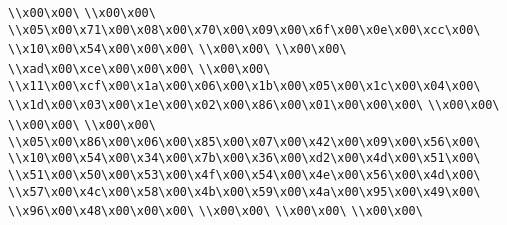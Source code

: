 \verb|\\x00\x00\|\newline
\verb|\\x00\x00\|\newline
\verb|\\x05\x00\x71\x00\x08\x00\x70\x00\x09\x00\x6f\x00\x0e\x00\xcc\x00\|\newline
\verb|\\x10\x00\x54\x00\x00\x00\|\newline
\verb|\\x00\x00\|\newline
\verb|\\x00\x00\|\newline
\verb|\\xad\x00\xce\x00\x00\x00\|\newline
\verb|\\x00\x00\|\newline
\verb|\\x11\x00\xcf\x00\x1a\x00\x06\x00\x1b\x00\x05\x00\x1c\x00\x04\x00\|\newline
\verb|\\x1d\x00\x03\x00\x1e\x00\x02\x00\x86\x00\x01\x00\x00\x00\|\newline
\verb|\\x00\x00\|\newline
\verb|\\x00\x00\|\newline
\verb|\\x00\x00\|\newline
\verb|\\x05\x00\x86\x00\x06\x00\x85\x00\x07\x00\x42\x00\x09\x00\x56\x00\|\newline
\verb|\\x10\x00\x54\x00\x34\x00\x7b\x00\x36\x00\xd2\x00\x4d\x00\x51\x00\|\newline
\verb|\\x51\x00\x50\x00\x53\x00\x4f\x00\x54\x00\x4e\x00\x56\x00\x4d\x00\|\newline
\verb|\\x57\x00\x4c\x00\x58\x00\x4b\x00\x59\x00\x4a\x00\x95\x00\x49\x00\|\newline
\verb|\\x96\x00\x48\x00\x00\x00\|\newline
\verb|\\x00\x00\|\newline
\verb|\\x00\x00\|\newline
\verb|\\x00\x00\|\newline
